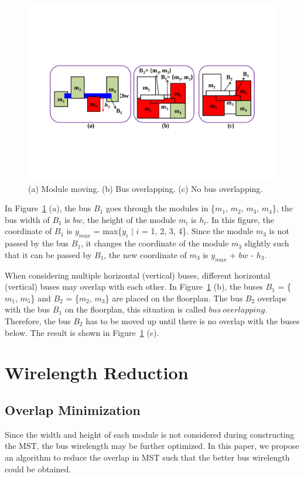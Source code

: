  \begin{figure}[htb]
  \centering
    \includegraphics[width=12cm]{Fig/bus_overlapping.pdf}
     \caption{
       (a) Module moving. (b) Bus overlapping. (c) No bus overlapping.
   }
  \label{fig::bus_overlapping}
\end{figure}

In Figure~\ref{fig::bus_overlapping} (a), the bus $B_1$ goes
through the modules in \{$m_1$, $m_2$, $m_3$, $m_4$\}, the bus
width of $B_1$ is $bw$, the height of the module $m_i$ is $h_i$.
In this figure, the coordinate of $B_1$ is $y_{max}$ = max\{$y_i$
$|$ $i$ = 1, 2, 3, 4\}. Since the module $m_3$ is not passed by the
bus $B_1$, it changes the coordinate of the module $m_3$
slightly such that it can be passed by $B_1$, the new coordinate
of $m_3$ is $y_{max}$ + $bw$ - $h_3$.

When considering multiple horizontal (vertical) buses, different
horizontal (vertical) buses may overlap with each other. In
Figure~\ref{fig::bus_overlapping} (b), the buses $B_1$ = \{$m_1$,
$m_5$\} and $B_2$ = \{$m_2$, $m_3$\} are placed on the floorplan.
The bus $B_2$ overlaps with the bus $B_1$ on the floorplan, this
situation is called $bus\ overlapping$. Therefore, the bus $B_2$ has
to be moved up until there is no overlap with the buses below. The result is shown in
Figure~\ref{fig::bus_overlapping} (c).

\section{Wirelength Reduction}
\subsection{Overlap Minimization}
\label{sec::Overlap Minimization}
Since the width and height of each module is not considered during constructing the MST,
the bus wirelength may be further optimized. In this paper,
we propose an algorithm to reduce the overlap in MST such that
the better bus wirelength could be obtained.

